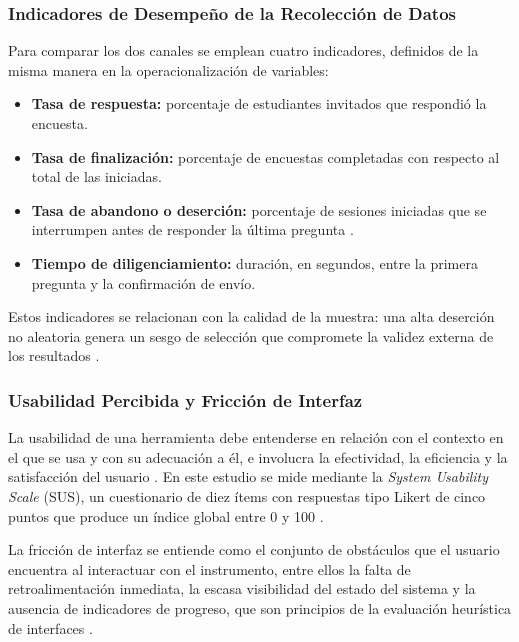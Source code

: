 \documentclass[12pt,letterpaper]{article}
\begin{document}
\subsubsection{Indicadores de Desempeño de la Recolección de Datos}
 
Para comparar los dos canales se emplean cuatro indicadores, definidos de la misma manera en la operacionalización de variables:
 
\begin{itemize}
    \item \textbf{Tasa de respuesta:} porcentaje de estudiantes invitados que respondió la encuesta.
    \item \textbf{Tasa de finalización:} porcentaje de encuestas completadas con respecto al total de las iniciadas.
    \item \textbf{Tasa de abandono o deserción:} porcentaje de sesiones iniciadas que se interrumpen antes de responder la última pregunta \cite{hoerger2010}.
    \item \textbf{Tiempo de diligenciamiento:} duración, en segundos, entre la primera pregunta y la confirmación de envío.
\end{itemize}
 
Estos indicadores se relacionan con la calidad de la muestra: una alta deserción no aleatoria genera un sesgo de selección que compromete la validez externa de los resultados \cite{hernandez2014}.
 
\subsubsection{Usabilidad Percibida y Fricción de Interfaz}
 
La usabilidad de una herramienta debe entenderse en relación con el contexto en el que se usa y con su adecuación a él, e involucra la efectividad, la eficiencia y la satisfacción del usuario \cite{brooke1996}. En este estudio se mide mediante la \textit{System Usability Scale} (SUS), un cuestionario de diez ítems con respuestas tipo Likert de cinco puntos que produce un índice global entre 0 y 100 \cite{brooke1996}.
 
La fricción de interfaz se entiende como el conjunto de obstáculos que el usuario encuentra al interactuar con el instrumento, entre ellos la falta de retroalimentación inmediata, la escasa visibilidad del estado del sistema y la ausencia de indicadores de progreso, que son principios de la evaluación heurística de interfaces \cite{nielsen1990}.
\end{document}
